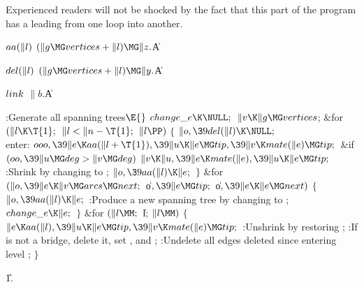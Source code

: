 Experienced readers will not be shocked by the fact that this part of
the program has a  leading from one loop into another.

\Y\B\4\D$\\{aa}(\|l)$ \5
$(\|g\MG\\{vertices}+\|l)\MG\|z.{}$\|A\par
\B\4\D$\\{del}(\|l)$ \5
$(\|g\MG\\{vertices}+\|l)\MG\|y.{}$\|A\par
\B\4\D$\\{link}$ \5
$\|b.{}$\|A\par
\Y\B\4:Generate all spanning trees\X${}\E{}$\6
$\\{change\_e}\K\NULL;{}$\6
${}\|v\K\|g\MG\\{vertices}{}$;\6
\&{for} ${}(\|l\K\T{1};{}$ ${}\|l<\|n-\T{1};{}$ ${}\|l\PP){}$\5
${}\{{}$\1\6
${}\|o,\39\\{del}(\|l)\K\NULL;{}$\6
\4\\{enter}:\5
${}\\{ooo},\39\|e\K\\{aa}(\|l+\T{1}),\39\|u\K\|e\MG\\{tip},\39\|v\K\\{mate}(%
\|e)\MG\\{tip};{}$\6
\&{if} ${}(\\{oo},\39\|u\MG\\{deg}>\|v\MG\\{deg}){}$\1\5
${}\|v\K\|u,\39\|e\K\\{mate}(\|e),\39\|u\K\|e\MG\\{tip};{}$\2\6
:Shrink  by changing  to \X;\6
${}\|o,\39\\{aa}(\|l)\K\|e;{}$\6
\4${}\}{}$\2\6
\&{for} ${}(\|o,\39\|e\K\|v\MG\\{arcs}\MG\\{next};{}$ \|o${},\39\|e\MG%
\\{tip};{}$ \|o${},\39\|e\K\|e\MG\\{next}){}$\5
${}\{{}$\1\6
${}\|o,\39\\{aa}(\|l)\K\|e;{}$\6
:Produce a new spanning tree by changing  to \X;\6
${}\\{change\_e}\K\|e;{}$\6
\4${}\}{}$\2\6
\&{for} ${}(\|l\MM;{}$ \|l; ${}\|l\MM){}$\5
${}\{{}$\1\6
${}\|e\K\\{aa}(\|l),\39\|u\K\|e\MG\\{tip},\39\|v\K\\{mate}(\|e)\MG\\{tip};{}$\6
:Unshrink  by restoring \X;\6
:If  is not a bridge, delete it, set , and
\X;\6
:Undelete all edges deleted since entering level \X;\6
\4${}\}{}$\2\par
\U1.\fi

